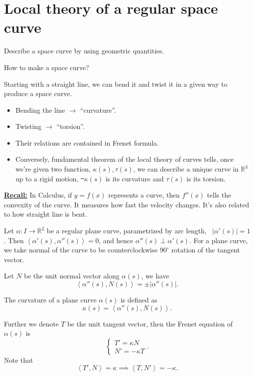 \section{Local theory of a regular space curve}

\begin{goal}
    Describe a space curve by using geometric quantities.
\end{goal}

\begin{ques}
    How to make a space curve? 
\end{ques}
Starting with a straight line, we can bend it and twist it in a given way to
produce a space curve.
\begin{itemize}
    \item Bending the line \(\longrightarrow\) ``curvature''.
    \item Twisting \(\longrightarrow\) ``torsion''.
    \item Their relations are contained in Frenet formula.
    \item Conversely, fundamental theorem of the local theory of curves
        tells, once we're given two function, \(\kappa(s),\tau(s)\), we can
        describe a unique curve in \(\mathbb{R}^3\) up to a rigid motion,
        \st\ \(\kappa(s)\) is its curvature and \(\tau(s)\) is its torsion.
\end{itemize}

\noindent\underline{\bf Recall:} In Calculus, if \(y=f(x)\) represents a curve, then
\(f''(x)\) tells the convexity of the curve. It measures how fast the velocity
changes. It's also related to how straight line is bent.


Let \(\alpha\colon I\to \mathbb{R}^2\) be a regular plane curve, parametrized by
arc length, \ie\ \(|\alpha'(s)|=1\). Then \(\left<\alpha'(s),\alpha''(s)\right> =0\),
and hence \(\alpha''(s)\perp\alpha'(s)\). For a plane curve, we take normal of the
curve to be counterclockwise \(90^\circ\) rotation of the tangent vector.


Let \(N\) be the unit normal vector along \(\alpha(s)\), we have \[
    \left<\alpha''(s),N(s)\right> =\pm|\alpha''(s)|
.\] 
\begin{defn}
    The curvature of a plane curve \(\alpha(s)\) is defined as \[
        \kappa(s)=\left<\alpha''(s),N(s)\right>
    .\] 
\end{defn}
\begin{defn}
    Further we denote \(T\) be the unit tangent vector, then the Frenet equation
    of \(\alpha(s)\) is \[
        \begin{cases}
            T'=\kappa N \\
            N'=-\kappa T
        \end{cases}
    .\] Note that \[
        \left<T',N\right> =\kappa\implies \left<T,N'\right> =-\kappa
    .\] 
\end{defn}

